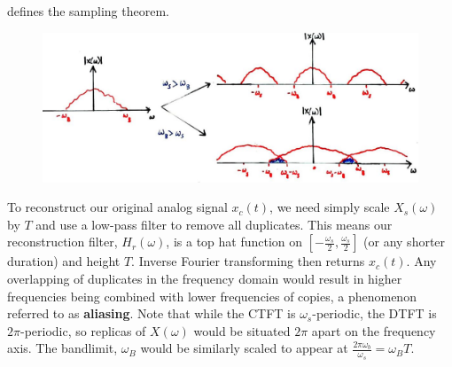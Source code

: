defines the sampling theorem.\\
%
\begin{figure}[!htb]
  \includegraphics[width=\textwidth]{images/lecture_13_nyquist.JPG}
  \caption{
  }
  \label{fig::lecture_13_nyquist}
\end{figure}
%
To reconstruct our original analog signal $x_c(t)$, we need simply scale
$X_s(\omega)$ by $T$ and use a low-pass filter to remove all duplicates.
This means our reconstruction filter, $H_r(\omega)$, is a top hat function
on $\left[-\frac{\omega_s}{2},\frac{\omega_s}{2}\right]$ (or any shorter
duration) and height $T$. Inverse Fourier transforming then returns $x_c(t)$.
Any overlapping of duplicates in the frequency domain would result in higher
frequencies being combined with lower frequencies of copies, a phenomenon
referred to as \textbf{aliasing}. Note that while the CTFT is
$\omega_s$-periodic, the DTFT is $2\pi$-periodic, so replicas of $X(\omega)$
would be situated $2\pi$ apart on the frequency axis. The bandlimit, $\omega_B$
would be similarly scaled to appear at $\frac{2\pi\omega_b}{\omega_s} = \omega_B T$.\\

